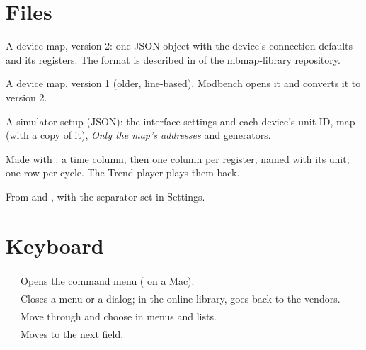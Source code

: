 \section{Files}

\begin{description}[style=nextline, leftmargin=0pt, font=\intermedium]
  \item[\file{.mbmap.json}] A device map, version 2: one JSON object with the
    device's connection defaults and its registers. The format is described
    in  of the mbmap-library repository.
  \item[\file{.mbmap}] A device map, version 1 (older, line-based). Modbench
    opens it and converts it to version 2.
  \item[\file{.mbsim}] A simulator setup (JSON): the interface settings and
    each device's unit ID, map (with a copy of it), \emph{Only the map's
    addresses} and generators.
  \item[Recordings (\file{.csv})] Made with : a time column, then
    one column per register, named with its unit; one row per cycle. The
    Trend player plays them back.
  \item[Logs and exports (\file{.csv})] From  and
    , with the separator set in Settings.
\end{description}

\section{Keyboard}

\begin{center}
\begin{tabularx}{\linewidth}{l L}
  \toprule
   &  \\
  \midrule
   & Opens the command menu ( on a Mac). \\
   & Closes a menu or a dialog; in the online library, goes back to
    the vendors. \\
     & Move through and choose in menus and lists. \\
   & Moves to the next field. \\
  \bottomrule
\end{tabularx}
\end{center}
